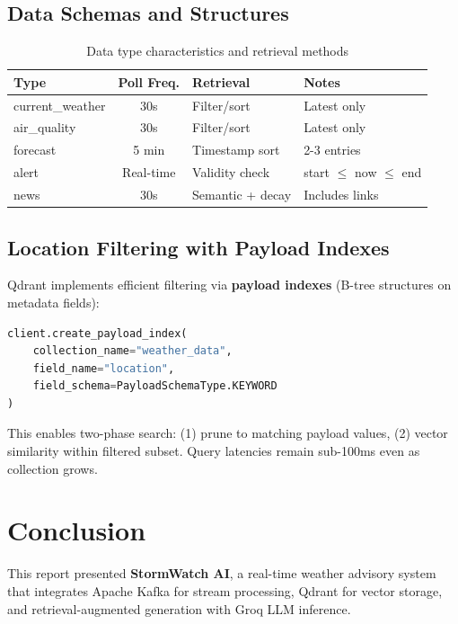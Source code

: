 \documentclass[11pt,a4paper]{article}
\begin{document}
\subsection{Data Schemas and Structures}

\begin{table}[H]
\centering
\caption{Data type characteristics and retrieval methods}
\renewcommand{\arraystretch}{1.3}
\begin{tabular}{l c l l}
\toprule
\textbf{Type} & \textbf{Poll Freq.} & \textbf{Retrieval} & \textbf{Notes} \\
\midrule
current\_weather & 30s & Filter/sort & Latest only \\
air\_quality & 30s & Filter/sort & Latest only \\
forecast & 5 min & Timestamp sort & 2-3 entries \\
alert & Real-time & Validity check & start $\leq$ now $\leq$ end \\
news & 30s & Semantic + decay & Includes links \\
\bottomrule
\end{tabular}
\end{table}

\subsection{Location Filtering with Payload Indexes}

Qdrant implements efficient filtering via \textbf{payload indexes} (B-tree structures on metadata fields):

\begin{lstlisting}[language=Python]
client.create_payload_index(
    collection_name="weather_data",
    field_name="location",
    field_schema=PayloadSchemaType.KEYWORD
)
\end{lstlisting}

This enables two-phase search: (1) prune to matching payload values, (2) vector similarity within filtered subset. Query latencies remain sub-100ms even as collection grows.

\section{Conclusion}

This report presented \textbf{StormWatch AI}, a real-time weather advisory system that integrates Apache Kafka for stream processing, Qdrant for vector storage, and retrieval-augmented generation with Groq LLM inference.
\end{document}
